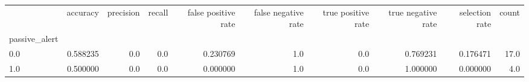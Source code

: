 \begin{tabular}{lrrrrrrrrr}
\toprule
{} &  accuracy &  precision &  recall &  false positive rate &  false negative rate &  true positive rate &  true negative rate &  selection rate &  count \\
passive\_alert &           &            &         &                      &                      &                     &                     &                 &        \\
\midrule
0.0           &  0.588235 &        0.0 &     0.0 &             0.230769 &                  1.0 &                 0.0 &            0.769231 &        0.176471 &   17.0 \\
1.0           &  0.500000 &        0.0 &     0.0 &             0.000000 &                  1.0 &                 0.0 &            1.000000 &        0.000000 &    4.0 \\
\bottomrule
\end{tabular}
